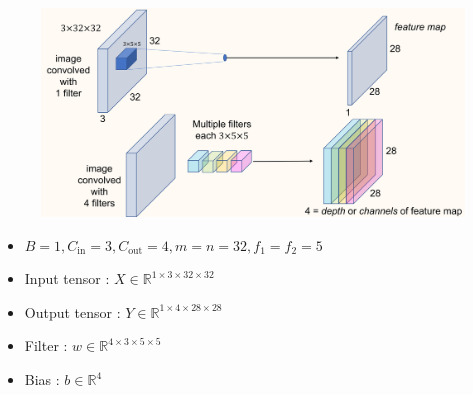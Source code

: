 \documentclass{report}
\begin{document}
\begin{example}
    \begin{figure}[H]
        \centering
        \includegraphics[width=1.0\textwidth]{.././assets/5.2.png}
    \end{figure}

    \begin{itemize}
        \item $B = 1, C_{\text{in}} = 3, C_{\text{out}} = 4, m=n=32, f_1=f_2=5$
        \item Input tensor : $X \in \mathbb{R}^{1 \times 3 \times 32 \times 32}$
        \item Output tensor : $Y \in \mathbb{R}^{1 \times 4 \times 28 \times 28}$
        \item Filter : $w \in \mathbb{R}^{4 \times 3 \times 5 \times 5}$
        \item Bias : $b \in \mathbb{R}^{4}$
    \end{itemize}
\end{example}
\end{document}
